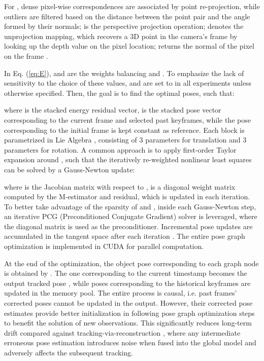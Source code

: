 \documentclass[letterpaper, 10 pt, conference]{ieeeconf}
\begin{document}
For , dense pixel-wise correspondences are associated by point re-projection, while outliers are filtered based on the distance between the point pair and the angle formed by their normals;  is the perspective projection operation;  denotes the unprojection mapping, which recovers a 3D point in the camera's frame by looking up the depth value on the pixel location;  returns the normal of the pixel on the frame . 

In Eq. (\ref{eq:E}),   and  are the weights balancing  and . To emphasize the lack of sensitivity to the choice of these values,  and  are set to  in all experiments unless otherwise specified. Then, the goal is to find the optimal poses, such that:
\vspace{-0.in}

where  is the stacked energy residual vector,  is the stacked pose vector corresponding to the current frame and  selected past keyframes, while the pose corresponding to the initial frame  is kept constant as reference. Each block  is parametrized in Lie Algebra \cite{bourbaki2008lie}, consisting of 3 parameters for translation and 3 parameters for rotation. A common approach is to apply first-order Taylor expansion around , such that the iteratively re-weighted nonlinear least squares can be solved by a Gauss-Newton update:

where  is the Jacobian matrix with respect to ,  is a diagonal weight matrix computed by the M-estimator  and residual, which is updated in each iteration. To better take advantage of the sparsity of  and , inside each Gauss-Newton step, an iterative PCG (Preconditioned Conjugate Gradient) \cite{hildebrand1987introduction} solver is leveraged, where the diagonal matrix  is used as the preconditioner. Incremental pose updates are accumulated in the tangent space after each iteration . The entire pose graph optimization is implemented in CUDA for parallel computation. 

At the end of the optimization, the object pose corresponding to each graph node is obtained by . The one corresponding to the current timestamp  becomes the output tracked pose , while poses corresponding to the historical keyframes are updated in the memory pool. The entire process is causal, i.e. past frames' corrected poses cannot be updated in the output. However, their corrected pose estimates provide better initialization in following pose graph optimization steps to benefit the solution of new observations. This significantly reduces long-term drift compared against tracking-via-reconstruction \cite{runz2018maskfusion}, where any intermediate erroneous pose estimation introduces noise when fused into the global model and adversely affects the subsequent tracking. 
\end{document}
